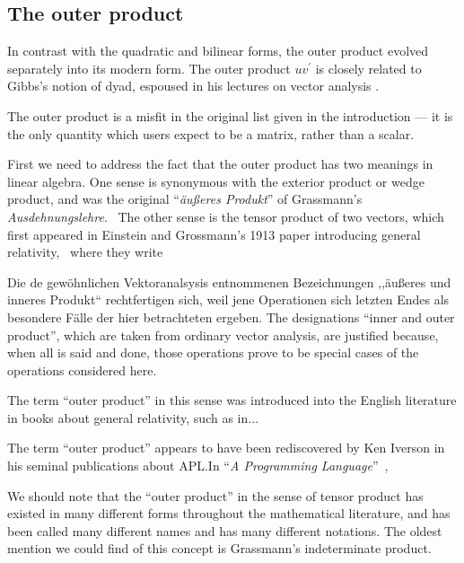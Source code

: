 \subsection{The outer product}


In contrast with the quadratic and bilinear forms, the outer product evolved separately into its modern form. The outer product $u v^\prime$ is closely related to Gibbs's notion of dyad, espoused in his lectures on vector analysis \cite{Gibbs1881,Wilson1901}.

The outer product is a misfit in the original list given in the introduction --- it is the only quantity which users expect to be a matrix, rather than a scalar.

First we need to address the fact that the outer product has two meanings in linear algebra. One sense is synonymous with the exterior product or wedge product, and was the original ``\textit{äußeres Produkt}'' of Grassmann's \textit{Ausdehnungslehre}.~\cite{Grassmann1844,Grassmann1862,Grassmann1995,Grassmann2000} The other sense is the tensor product of two vectors, which first appeared in Einstein and Grossmann's 1913 paper introducing general relativity,~\cite{Einstein1913} where they write

Die de gewöhnlichen Vektoranalsysis entnommenen Bezeichnungen ,,äußeres und inneres Produkt`` rechtfertigen sich, weil jene Operationen sich letzten Endes als besondere Fälle der hier betrachteten ergeben. The designations ``inner and outer product'', which are taken from ordinary vector analysis, are justified because, when all is said and done, those operations prove to be special cases of the operations considered here.~\cite[T. II, p. 26]{Einstein1913,Einstein1996}



The term ``outer product'' in this sense was introduced into the English literature in books about general relativity, such as in...

The term ``outer product'' appears to have been rediscovered by Ken Iverson in his seminal publications about APL.\@ In ``\textit{A Programming Language}''~\cite{Iverson1962book},

We should note that the ``outer product'' in the sense of tensor product has existed in many different forms throughout the mathematical literature, and has been called many different names and has many different notations. The oldest mention we could find of this concept is Grassmann's indeterminate product.


